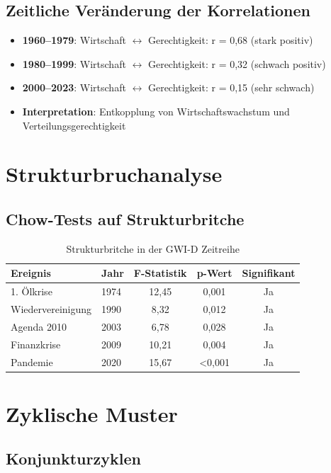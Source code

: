 \subsection{Zeitliche Veränderung der Korrelationen}

\begin{itemize}
\item \textbf{1960--1979}: Wirtschaft $\leftrightarrow$ Gerechtigkeit: r = 0,68 (stark positiv)
\item \textbf{1980--1999}: Wirtschaft $\leftrightarrow$ Gerechtigkeit: r = 0,32 (schwach positiv)
\item \textbf{2000--2023}: Wirtschaft $\leftrightarrow$ Gerechtigkeit: r = 0,15 (sehr schwach)
\item \textbf{Interpretation}: Entkopplung von Wirtschaftswachstum und Verteilungsgerechtigkeit
\end{itemize}

\section{Strukturbruchanalyse}

\subsection{Chow-Tests auf Strukturbritche}

\begin{table}[ht]
\centering
\begin{tabular}{llccc}
\toprule
\textbf{Ereignis} & \textbf{Jahr} & \textbf{F-Statistik} & \textbf{p-Wert} & \textbf{Signifikant} \\
\midrule
1. Ölkrise & 1974 & 12,45 & 0,001 & Ja \\
Wiedervereinigung & 1990 & 8,32 & 0,012 & Ja \\
Agenda 2010 & 2003 & 6,78 & 0,028 & Ja \\
Finanzkrise & 2009 & 10,21 & 0,004 & Ja \\
Pandemie & 2020 & 15,67 & <0,001 & Ja \\
\bottomrule
\end{tabular}
\caption{Strukturbritche in der GWI-D Zeitreihe}
\label{tab:strukturbruche}
\end{table}

\section{Zyklische Muster}

\subsection{Konjunkturzyklen}

